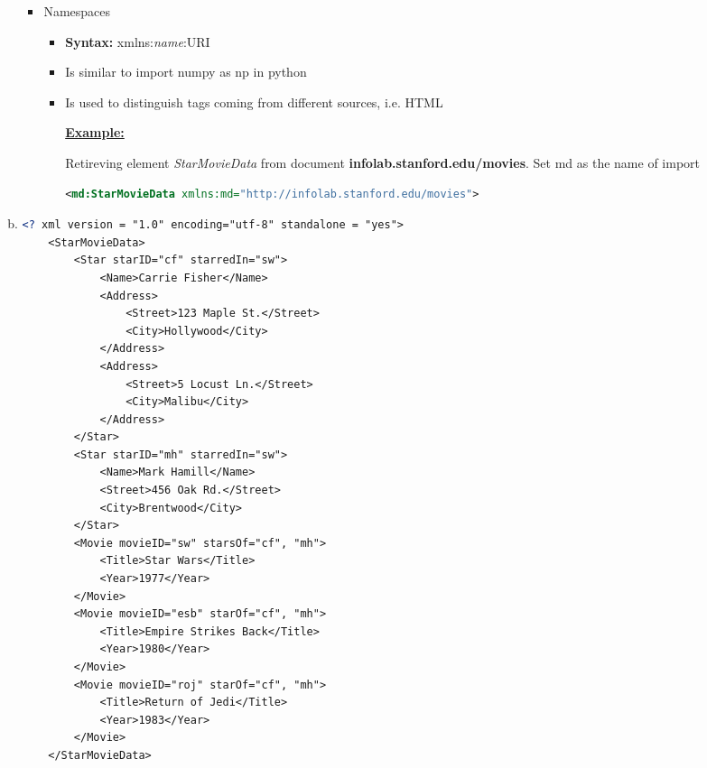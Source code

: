 \documentclass[12pt]{article}
\begin{document}
\begin{enumerate}[1.]
\begin{enumerate}[a)]
\begin{itemize}
\begin{itemize}
        \end{itemize}

        \item Namespaces
        \begin{itemize}
            \item \textbf{Syntax:} xmlns:\textit{name}:URI
            \item Is similar to import numpy as np in python
            \item Is used to distinguish tags coming from different sources, i.e. HTML

            \bigskip

            \underline{\textbf{Example:}}

            \bigskip

            Retireving element \textit{StarMovieData} from document \textbf{infolab.stanford.edu/movies}.
            Set md as the name of import

    \begin{lstlisting}[language=XML]
    <md:StarMovieData xmlns:md="http://infolab.stanford.edu/movies">
    \end{lstlisting}
        \end{itemize}
    \end{itemize}

        \item

    \begin{lstlisting}[language=XML]
    <? xml version = "1.0" encoding="utf-8" standalone = "yes">
    <StarMovieData>
        <Star starID="cf" starredIn="sw">
            <Name>Carrie Fisher</Name>
            <Address>
                <Street>123 Maple St.</Street>
                <City>Hollywood</City>
            </Address>
            <Address>
                <Street>5 Locust Ln.</Street>
                <City>Malibu</City>
            </Address>
        </Star>
        <Star starID="mh" starredIn="sw">
            <Name>Mark Hamill</Name>
            <Street>456 Oak Rd.</Street>
            <City>Brentwood</City>
        </Star>
        <Movie movieID="sw" starsOf="cf", "mh">
            <Title>Star Wars</Title>
            <Year>1977</Year>
        </Movie>
        <Movie movieID="esb" starOf="cf", "mh">
            <Title>Empire Strikes Back</Title>
            <Year>1980</Year>
        </Movie>
        <Movie movieID="roj" starOf="cf", "mh">
            <Title>Return of Jedi</Title>
            <Year>1983</Year>
        </Movie>
    </StarMovieData>
    \end{lstlisting}


\end{enumerate}
\end{enumerate}
\end{document}
